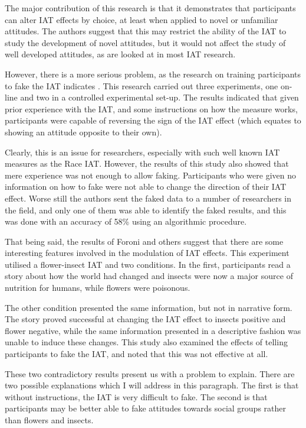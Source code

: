 The major contribution of this research is that it demonstrates that participants can alter IAT effects by choice, at least when applied to novel or unfamiliar attitudes. The authors suggest that this may restrict the ability of the IAT to study the development of novel attitudes, but it would not affect the study of well developed attitudes, as are looked at in most IAT research.

However, there is a more serious problem, as the research on training participants to fake the IAT indicates \cite{Fiedler2005}. This research carried out three experiments, one on-line and two in a controlled experimental set-up. The results indicated that given prior experience with the IAT, and some instructions on how the measure works, participants were capable of reversing the sign of the IAT effect (which equates to showing an attitude opposite to their own). 

Clearly, this is an issue for researchers, especially with such well known IAT measures as the Race IAT. However, the results of this study also showed that mere experience was not enough to allow faking. Participants who were given no information on how to fake were not able to change the direction of their IAT effect. Worse still the authors sent the faked data to a number of researchers in the field, and only one of them was able to identify the faked results, and this was done with an accuracy of 58\% using an algorithmic procedure.   

That being said, the results of Foroni and others \cite{Foroni2005}  suggest that there are some interesting features involved in the modulation of IAT effects. This experiment utilised a flower-insect IAT \cite{Greenwald1998} and two conditions. In the first, participants read a story about how the world had changed and insects were now a major source of nutrition for humans, while flowers were poisonous. 

The other condition presented the same information, but not in narrative form. The story proved successful at changing the IAT effect to insects positive and flower negative, while the same information presented in a descriptive fashion was unable to induce these changes. This study also examined the effects of telling participants to fake the IAT, and noted that this was not effective at all. 

These two contradictory results present us with a problem to explain. There are two possible explanations which I will address in this paragraph. The first is that without instructions, the IAT is very difficult to fake. The second is that participants may be better able to fake attitudes towards social groups rather than flowers and insects. 

